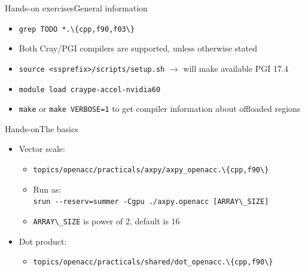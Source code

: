 \documentclass[12pt,aspectratio=169]{beamer}
\newcommand\shinline[2][]{\lstinline[style=shstyle,basicstyle=\ttfamily,#1]!#2!}
\begin{document}

\begin{frame}[fragile]{Hands-on exercises}{General information}
  \begin{itemize}
  \item \shinline{grep TODO *.\{cpp,f90,f03\}}
  \item Both Cray/PGI compilers are supported, unless otherwise stated
  \item \shinline{source <ssprefix>/scripts/setup.sh} $\rightarrow$ will make available PGI 17.4
  \item \shinline{module load craype-accel-nvidia60}
  \item \shinline{make} or \shinline{make VERBOSE=1} to get compiler information about offloaded regions
  \end{itemize}
\end{frame}

\begin{frame}{Hands-on}{The basics}
  \begin{itemize}
  \item Vector scale:
    \begin{itemize}
    \item \shinline{topics/openacc/practicals/axpy/axpy_openacc.\{cpp,f90\}}
    \item Run as: \\
      \shinline{srun --reserv=summer -Cgpu ./axpy.openacc [ARRAY\_SIZE]}
    \item \shinline{ARRAY\_SIZE} is power of 2, default is 16
    \end{itemize}
    \vfill
  \item Dot product:
    \begin{itemize}
    \item \shinline{topics/openacc/practicals/shared/dot_openacc.\{cpp,f90\}}
    \end{itemize}
  \end{itemize}
\end{frame}
\end{document}
